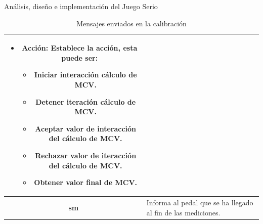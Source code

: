 \begin{thesischapter}{2} {Análisis, diseño e implementación del Juego Serio}
\begin{table}[h]
\begin{tabular}{ |c|p{14cm}|}
\begin{minipage}{14cm}
\begin{itemize}
                                    \item \textbf{Acción}: Establece la acción, esta puede ser: 
                                    \begin{itemize}
                                        \item Iniciar interacción cálculo de MCV.
                                        \item Detener iteración cálculo de MCV.
                                        \item Aceptar valor de interacción del cálculo de MCV.
                                        \item Rechazar valor de iteracción del cálculo de MCV.
                                        \item Obtener valor final de MCV.
                                    \end{itemize}
                                \end{itemize} 
                                \vspace{1pt}
                            \end{minipage}\\\hline
        \textbf{sm}     &   Informa al pedal que se ha llegado al fin de las mediciones. \\\hline               

    \end{tabular}
    \caption{Mensajes enviados en la calibración}
    \label{table:send-msg-in-calibration}
\end{table}  


\end{thesischapter}
